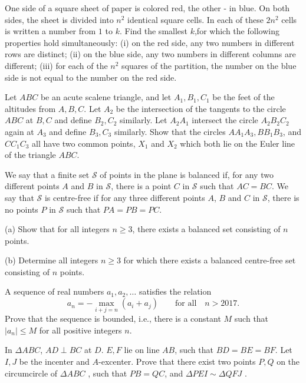 \documentclass[11pt]{scrartcl}
\begin{document}
\begin{problem}[8317584744128058138]
	One side of a square sheet of paper is colored red, the other - in blue. On both sides, the sheet is divided into $n^2$ identical square cells. In each of these $2n^2$ cells is written a number from $1$ to $k$. Find the smallest $k$,for which the following properties hold simultaneously:
(i) on the red side, any two numbers in different rows are distinct;
(ii) on the blue side, any two numbers in different columns are different;
(iii) for each of the $n^2$ squares of the partition, the number on the blue side is not equal to the number on the red side.
\end{problem}
\begin{problem}[8330669807899443473]
Let $ABC$ be an acute scalene triangle, and let $A_1, B_1, C_1$ be the feet of the altitudes from $A, B, C$. Let $A_2$ be the intersection of the tangents to the circle $ABC$ at $B, C$ and define $B_2, C_2$ similarly. Let $A_2A_1$ intersect the circle $A_2B_2C_2$ again at $A_3$ and define $B_3, C_3$ similarly. Show that the circles $AA_1A_3, BB_1B_3$, and $CC_1C_3$ all have two common points, $X_1$ and $X_2$ which both lie on the Euler line of the triangle $ABC$.
\end{problem}
\begin{problem}[8354552322611949357]
We say that a finite set $\mathcal{S}$ of points in the plane is balanced if, for any two different points $A$ and $B$ in $\mathcal{S}$, there is a point $C$ in $\mathcal{S}$ such that $AC=BC$. We say that $\mathcal{S}$ is centre-free if for any three different points $A$, $B$ and $C$ in $\mathcal{S}$, there is no points $P$ in $\mathcal{S}$ such that $PA=PB=PC$.

(a) Show that for all integers $n\ge 3$, there exists a balanced set consisting of $n$ points.

(b) Determine all integers $n\ge 3$ for which there exists a balanced centre-free set consisting of $n$ points.
\end{problem}
\begin{problem}[8383644831210009641]
A sequence of real numbers $a_1,a_2,\ldots$ satisfies the relation
$$a_n=-\max_{i+j=n}(a_i+a_j)\qquad\text{for all}\quad n>2017.$$Prove that the sequence is bounded, i.e., there is a constant $M$ such that $|a_n|\leq M$ for all positive integers $n$.
\end{problem}
\begin{problem}[8402748184217471405]
In $\Delta ABC$, $AD \perp BC$ at $D$. $E,F$ lie on line $AB$, such that $BD=BE=BF$. Let $I,J$ be the incenter and $A$-excenter. Prove that there exist two points $P,Q$ on the circumcircle of $\Delta ABC$ , such that $PB=QC$, and $\Delta PEI \sim \Delta QFJ$ .
\end{problem}
\end{document}
